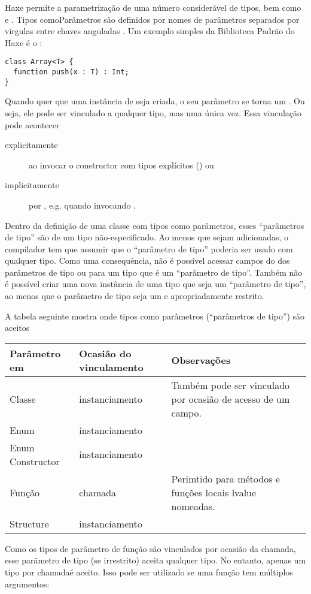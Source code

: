 Haxe permite a parametrização de uma número considerável de tipos, bem como  e . Tipos comoParâmetros são definidos por nomes de parâmetros separados por virgulas entre chaves anguladas \expr{$< >$}. Um exemplo simples da Biblioteca Padrão do Haxe é o :

\begin{lstlisting}
class Array<T> {
  function push(x : T) : Int;
}
\end{lstlisting}
Quando quer que uma instância de  seja criada, o seu parâmetro  se torna um . Ou seja, ele pode ser vinculado a qualquer tipo, mas uma única vez. Essa vinculação pode acontecer

\begin{description}
	\item[explicitamente] ao invocar o constructor com tipos explícitos () ou
	\item[implicitamente] por , e.g. quando invocando .
\end{description}
Dentro da definição de uma classe com tipos como parâmetros, esses ``parâmetros de tipo'' são de um tipo não-especificado. Ao menos que  sejam adicionadas, o compilador tem que assumir que o ``parâmetro de tipo'' poderia ser usado com qualquer tipo. Como uma consequência, não é possível acessar campos do dos parâmetros de tipo ou  para um tipo que é um ``parâmetro de tipo''. Também não é possível criar uma nova instância de uma tipo que seja um ``parâmetro de tipo'', ao menos que o parâmetro de tipo seja um  e apropriadamente restrito. 

A tabela seguinte mostra onde tipos como parâmetros (``parâmetros de tipo'') são aceitos

\begin{center}
\begin{tabular}{| l | l | l |}
	\hline
	Parâmetro em & Ocasião do vinculamento & Observações \\ \hline
	Classe & instanciamento & Também pode ser vinculado por ocasião de acesso de um campo. \\
	Enum & instanciamento & \\
	Enum Constructor & instanciamento & \\
	Função & chamada & Perimtido para métodos e funções locais lvalue nomeadas. \\
	Structure & instanciamento & \\ \hline
\end{tabular}
\end{center}
Como os tipos de parâmetro de função são vinculados por ocasião da chamada, esse parãmetro de tipo (se irrestrito) aceita qualquer tipo. No entanto, apenas um tipo por chamadaé aceito. Isso pode ser utilizado se uma função tem múltiplos argumentos: 

